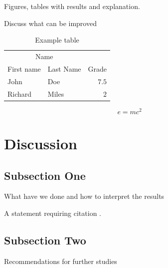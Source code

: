\documentclass[twoside,twocolumn]{article}
\begin{document}
	Figures, tables with results and explanation.
	
	Discuss what can be improved
		
	\begin{table}
		\caption{Example table}
		\centering
		\begin{tabular}{llr}
			\toprule
			\multicolumn{2}{c}{Name} \\
			\cmidrule(r){1-2}
			First name & Last Name & Grade \\
			\midrule
			John & Doe & $7.5$ \\
			Richard & Miles & $2$ \\
			\bottomrule
		\end{tabular}
	\end{table}
	
	\blindtext %
	
	\begin{equation}
		\label{eq:emc}
		e = mc^2
	\end{equation}
	
	\blindtext %
	
	
	\section{Discussion}
	
	\subsection{Subsection One}
	
	What have we done and how to interpret the results
	
	A statement requiring citation \cite{Figueredo:2009dg}.
	\blindtext %
	
	\subsection{Subsection Two}
	
	Recommendations for further studies
	
	\blindtext %
	
	
\end{document}

